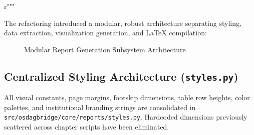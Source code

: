 r"""\documentclass[11pt,a4paper]{article}
\begin{document}
The refactoring introduced a modular, robust architecture separating styling, data extraction, visualization generation, and LaTeX compilation:

\begin{figure}[h!]
\centering
{}
\caption{Modular Report Generation Subsystem Architecture}
\end{figure}

\subsection{Centralized Styling Architecture (\texttt{styles.py})}
All visual constants, page margins, footskip dimensions, table row heights, color palettes, and institutional branding strings are consolidated in \texttt{src/osdagbridge/core/reports/styles.py}. Hardcoded dimensions previously scattered across chapter scripts have been eliminated.
\end{document}
